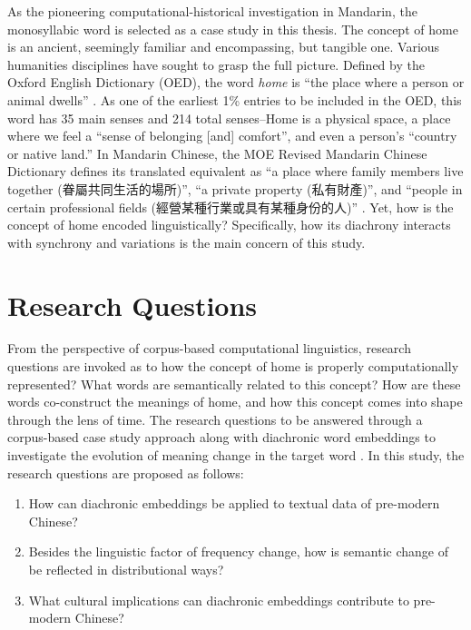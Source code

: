 As the pioneering computational-historical investigation in Mandarin, the monosyllabic word  is selected as a case study in this thesis. The concept of home is an ancient, seemingly familiar and encompassing, but tangible one. Various humanities disciplines have sought to grasp the full picture. Defined by the Oxford English Dictionary (OED), the word \textit{home} is ``the place where a person or animal dwells'' . As one of the earliest 1\% entries to be included in the OED, this word has 35 main senses and 214 total senses--Home is a physical space, a place where we feel a ``sense of belonging [and] comfort'', and even a person's ``country or native land.'' In Mandarin Chinese, the MOE Revised Mandarin Chinese Dictionary defines its translated equivalent  as ``a place where family members live together (眷屬共同生活的場所)'', ``a private property (私有財產)'', and ``people in certain professional fields (經營某種行業或具有某種身份的人)'' . Yet, how is the concept of home encoded linguistically? Specifically, how its diachrony interacts with synchrony and variations is the main concern of this study.

\section{Research Questions}
From the perspective of corpus-based computational linguistics, research questions are invoked as to how the concept of home is properly computationally represented? What words are semantically related to this concept? How are these words co-construct the meanings of home, and how this concept comes into shape through the lens of time. The research questions to be answered through a corpus-based case study approach along with diachronic word embeddings to investigate the evolution of meaning change in the target word \jia\rspace. In this study, the research questions are proposed as follows:

\begin{enumerate}[label={(\arabic*)},nolistsep]
    \item How can diachronic embeddings be applied to textual data of pre-modern Chinese?
    \item Besides the linguistic factor of frequency change, how is semantic change of \jia be reflected in distributional ways?
    \item What cultural implications can diachronic embeddings contribute to pre-modern Chinese?
\end{enumerate}

